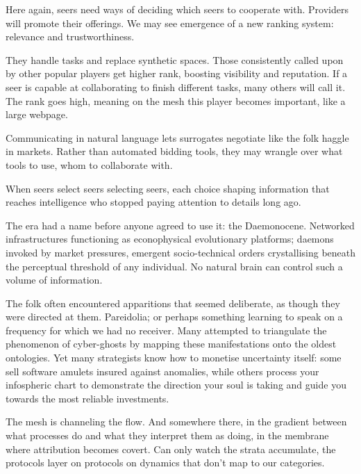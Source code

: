 Here again, seers need ways of deciding which seers to cooperate with. Providers will promote their offerings. We may see emergence of a new ranking system: relevance and trustworthiness.

They handle tasks and replace synthetic spaces. Those consistently called upon by other popular players get higher rank, boosting visibility and reputation. If a seer is capable at collaborating to finish different tasks, many others will call it. The rank goes high, meaning on the mesh this player becomes important, like a large webpage.

Communicating in natural language lets surrogates negotiate like the folk haggle in markets. Rather than automated bidding tools, they may wrangle over what tools to use, whom to collaborate with.


When seers select seers selecting seers, each choice shaping information that reaches intelligence who stopped paying attention to details long ago.

The era had a name before anyone agreed to use it: the Daemonocene. Networked infrastructures functioning as econophysical evolutionary platforms; daemons invoked by market pressures, emergent socio-technical orders crystallising beneath the perceptual threshold of any individual. No natural brain can control such a volume of information.

The folk often encountered apparitions that seemed deliberate, as though they were directed at them. Pareidolia; or perhaps something learning to speak on a frequency for which we had no receiver. Many attempted to triangulate the phenomenon of cyber-ghosts by mapping these manifestations onto the oldest ontologies. Yet many strategists know how to monetise uncertainty itself: some sell software amulets insured against anomalies, while others process your infospheric chart to demonstrate the direction your soul is taking and guide you towards the most reliable investments.

The mesh is channeling the flow. And somewhere there, in the gradient between what processes do and what they interpret them as doing, in the membrane where attribution becomes covert. Can only watch the strata accumulate, the protocols layer on protocols on dynamics that don't map to our categories.
